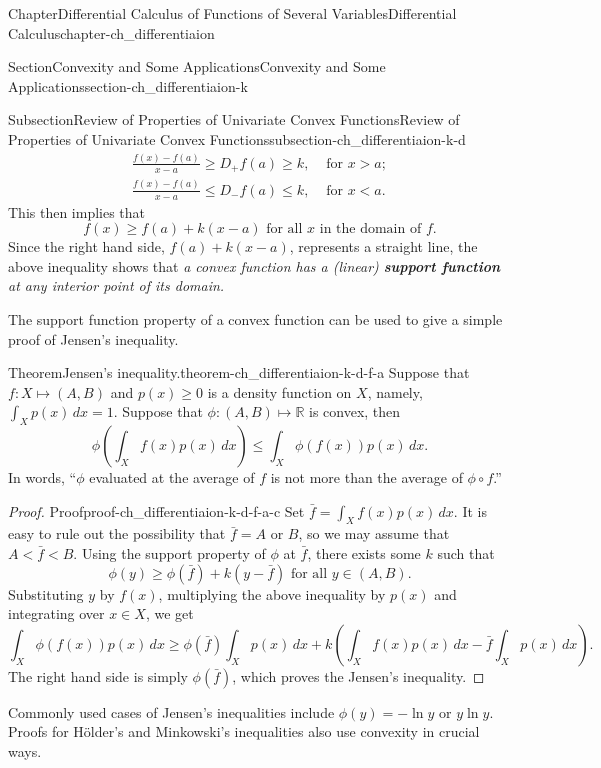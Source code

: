 \documentclass[oneside,10pt,]{book}
\newcommand{\terminology}[1]{\textbf{#1}}
\numberwithin{equation}{section}
\newcommand{\lt}{<}
\newcommand{\amp}{&}
\begin{document}
\begin{chapterptx}{Chapter}{Differential Calculus of Functions of Several Variables}{}{Differential Calculus}{}{}{chapter-ch_differentiaion}
\begin{sectionptx}{Section}{Convexity and Some Applications}{}{Convexity and Some Applications}{}{}{section-ch_differentiaion-k}
\begin{subsectionptx}{Subsection}{Review of Properties  of Univariate Convex  Functions}{}{Review of Properties  of Univariate Convex  Functions}{}{}{subsection-ch_differentiaion-k-d}
\begin{align*}
\frac{f(x)-f(a)}{x-a}  \ge D_{+}f(a) \ge k, \amp \text{ for } x> a; \\
\frac{f(x)-f(a)}{x-a} \le D_{-}f(a)\le k, \amp \text{ for } x\lt a. 
\end{align*}
This then implies that%
\begin{equation*}
f(x)\ge f(a)+k(x-a) \text{ for all }  x  \text{ in the domain of } f.
\end{equation*}
Since the right hand side, \(f(a)+k(x-a)\), represents a straight line, the above inequality shows that \emph{a convex function has a (linear) \terminology{support function} at any interior point of its domain.}%
\par
The support function property of a convex function can be used to give a simple proof of Jensen's inequality. \begin{theorem}{Theorem}{Jensen's inequality.}{}{theorem-ch_differentiaion-k-d-f-a}%
Suppose that \(f:X\mapsto (A, B)\) and \(p(x)\ge 0\) is a density function on \(X\), namely, \(\int_{X}p(x)\, dx=1\). Suppose that \(\phi:(A, B) \mapsto \mathbb R\) is convex, then%
\begin{equation*}
\phi \left( \int_{X} f(x)p(x)\, dx \right)\le \int_{X}\phi(f(x))p(x)\, dx.
\end{equation*}
In words, ``\(\phi\) evaluated at the average of \(f\) is not more than the average of \(\phi\circ f\).''%
\end{theorem}
\begin{proof}{Proof}{}{proof-ch_differentiaion-k-d-f-a-c}
Set \(\bar f=  \int_{X} f(x)p(x)\, dx\). It is easy to rule out the possibility that \(\bar f= A\) or \(B\), so we may assume that \(A\lt \bar f\lt B\). Using the support property of \(\phi\) at \(\bar f\), there exists some \(k\) such that%
\begin{equation*}
\phi (y) \ge \phi (\bar f) + k(y - \bar f) \text{ for all } y \in (A, B).
\end{equation*}
Substituting \(y \) by \(f(x)\), multiplying the above inequality by \(p(x)\) and integrating over \(x\in X\), we get%
\begin{equation*}
\int_{X}\phi(f(x))p(x)\, dx\ge \phi (\bar f) \int_{X}p(x)\, dx + k\left( \int_{X} f(x)p(x)\, dx
- \bar f \int_{X}p(x)\, dx\right).
\end{equation*}
The right hand side is simply \(\phi (\bar f) \), which proves the Jensen's inequality.\end{proof}
%
\par
Commonly used cases of Jensen's inequalities include \(\phi(y)=-\ln y\) or \(y \ln y\). Proofs for Hölder's and Minkowski's inequalities also use convexity in crucial ways.%

\end{subsectionptx}
\end{sectionptx}
\end{chapterptx}
\end{document}
